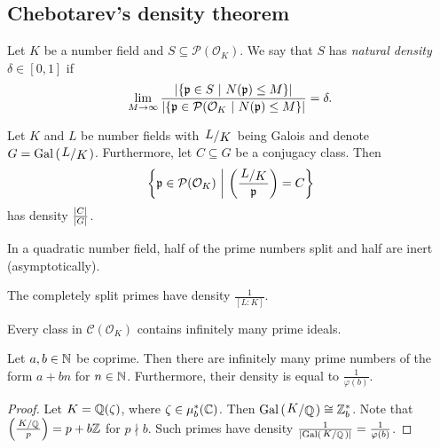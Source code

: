 \newpage

\subsection{Chebotarev's density theorem}

\begin{definicija}
Let $K$ be a number field and
$S \subseteq \mathcal{P}(\mathcal{O}_K)$. We say that $S$ has
\emph{natural density} $\delta \in [0, 1]$
if
\[
\lim_{M \to \infty}
\frac{\left\lvert \left\{\mathfrak{p} \in S~\middle\vert~N(\mathfrak{p}) \leq M\right\}\right\rvert}
{\left\lvert \left\{\mathfrak{p} \in \mathcal{P}(\mathcal{O}_K~\middle\vert~N(\mathfrak{p}) \leq M\right\}\right\rvert} =
\delta.
\]
\end{definicija}

\begin{izrek}[Chebotarev]
Let $K$ and $L$ be number fields with $\kvoc{L}{K}$ being Galois
and denote $G = \Gal \br{\kvoc{L}{K}}$. Furthermore, let
$C \subseteq G$ be a conjugacy class. Then
\[
\setb{\mathfrak{p} \in \mathcal{P}(\mathcal{O}_K)}
{\br{\frac{\kvoc{L}{K}}{\mathfrak{p}}} = C}
\]
has density $\frac{\left\lvert C\right\rvert}{\left\lvert G\right\rvert}$.
\end{izrek}

\begin{posledica}
In a quadratic number field, half of the prime numbers split and
half are inert (asymptotically).
\end{posledica}

\begin{posledica}
The completely split primes have density $\frac{1}{[L : K]}$.
\end{posledica}

\begin{posledica}
Every class in $\mathcal{C}(\mathcal{O}_K)$ contains infinitely
many prime ideals.
\end{posledica}

\begin{izrek}[Dirichlet]
Let $a, b \in \mathbb{N}$ be coprime. Then there are infinitely many prime
numbers of the form $a + bn$ for $n \in \mathbb{N}$. Furthermore, their
density is equal to $\frac{1}{\varphi(b)}$.
\end{izrek}

\begin{proof}
Let $K = \mathbb{Q}(\zeta)$, where $\zeta \in \mu_b^*(\mathbb{C})$. Then
$\Gal \br{\kvoc{K}{\Q}} \cong \Z_b^*$. Note that
$\br{\frac{\kvoc{K}{\Q}}{p}} = p + b\Z$ for $p \nmid b$. Such
primes have density
$\frac{1}{\abs{\Gal \br{\kvoc{K}{\Q}}}} = \frac{1}{\varphi(b)}$.
\end{proof}
